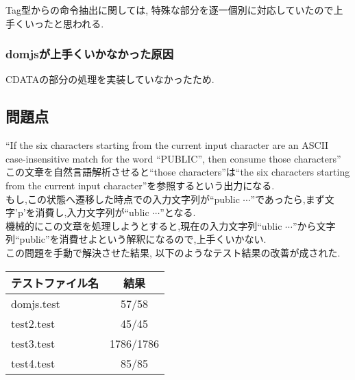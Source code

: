 \documentclass[uplatex,a4j]{jsreport}
\begin{document}
Tag型からの命令抽出に関しては, 特殊な部分を逐一個別に対応していたので上手くいったと思われる.%
\subsubsection*{domjsが上手くいかなかった原因}
CDATAの部分の処理を実装していなかったため.

\subsection{問題点}
``If the six characters starting from the current input character are an ASCII case-insensitive match for the word ``PUBLIC'', then consume those characters''
この文章を自然言語解析させると``those characters''は``the six characters starting from the current input character''を参照するという出力になる.\\
もし,この状態へ遷移した時点での入力文字列が``public $\cdots$''であったら,まず文字'p'を消費し,入力文字列が``ublic $\cdots$''となる.\\
機械的にこの文章を処理しようとすると,現在の入力文字列``ublic $\cdots$''から文字列``public''を消費せよという解釈になるので,上手くいかない.\\
この問題を手動で解決させた結果, 以下のようなテスト結果の改善が成された.\\
\begin{table}[htb]
    \begin{tabular}{|l|c|} \hline
      テストファイル名 & 結果 \\ \hline 
      domjs.test & 57/58 \\
      test2.test & 45/45 \\
      test3.test & 1786/1786 \\
      test4.test & 85/85 \\ \hline 
    \end{tabular}
\end{table}
\end{document}

